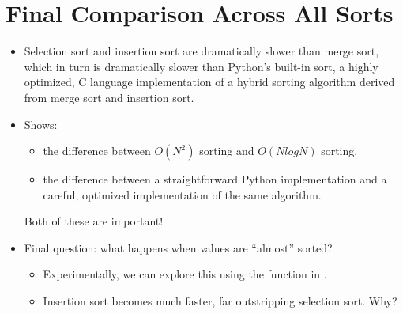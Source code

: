 \documentclass[letterpaper,10pt,english]{sphinxmanual}
\begin{document}
\section{Final Comparison Across All Sorts}
\label{\detokenize{lecture_notes/lec21_sorting:final-comparison-across-all-sorts}}\begin{itemize}
\item {} 
Selection sort and insertion sort are dramatically slower than merge
sort, which in turn is dramatically slower than Python’s built-in
sort, a highly optimized, C language implementation of a hybrid
sorting algorithm derived from merge sort and insertion sort.

\item {} 
Shows:
\begin{itemize}
\item {} 
the difference between \(O(N^2)\) sorting and
\(O(N log N)\) sorting.

\item {} 
the difference between a straightforward Python implementation
and a careful, optimized implementation of the same algorithm.

\end{itemize}

Both of these are important!

\item {} 
Final question: what happens when values are “almost” sorted?
\begin{itemize}
\item {} 
Experimentally, we can explore this using the
 function in .

\item {} 
Insertion sort becomes much faster, far outstripping selection
sort. Why?

\end{itemize}

\end{itemize}
\end{document}
